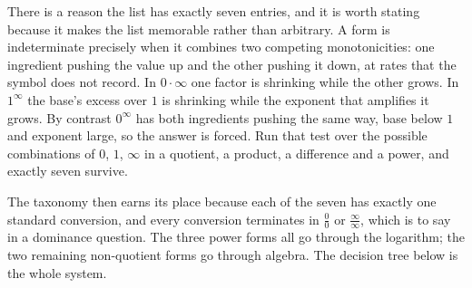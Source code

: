There is a reason the list has exactly seven entries, and it is worth stating because it makes the list memorable rather than arbitrary. A form is indeterminate precisely when it combines two competing monotonicities: one ingredient pushing the value up and the other pushing it down, at rates that the symbol does not record. In $0\cdot\infty$ one factor is shrinking while the other grows. In $1^{\infty}$ the base's excess over $1$ is shrinking while the exponent that amplifies it grows. By contrast $0^{\infty}$ has both ingredients pushing the same way, base below $1$ and exponent large, so the answer is forced. Run that test over the possible combinations of $0$, $1$, $\infty$ in a quotient, a product, a difference and a power, and exactly seven survive.

The taxonomy then earns its place because each of the seven has exactly one standard conversion, and every conversion terminates in $\tfrac00$ or $\tfrac{\infty}{\infty}$, which is to say in a dominance question. The three power forms all go through the logarithm; the two remaining non-quotient forms go through algebra. The decision tree below is the whole system.

\begin{center}
\end{center}

